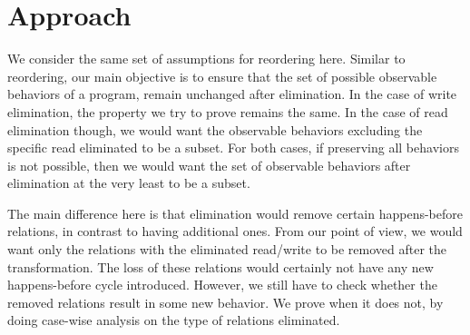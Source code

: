 \section{Approach}

    We consider the same set of assumptions for reordering here. 
    Similar to reordering, our main objective is to ensure that the set of possible observable behaviors of a program, remain unchanged after elimination. 
    In the case of write elimination, the property we try to prove remains the same.
    In the case of read elimination though, we would want the observable behaviors excluding the specific read eliminated to be a subset.
    For both cases, if preserving all behaviors is not possible, then we would want the set of observable behaviors after elimination at the very least to be a subset.

    The main difference here is that elimination would remove certain happens-before relations, in contrast to having additional ones.
    From our point of view, we would want only the relations with the eliminated read/write to be removed after the transformation.
    The loss of these relations would certainly not have any new happens-before cycle introduced. 
    However, we still have to check whether the removed relations result in some new behavior. 
    We prove when it does not, by doing case-wise analysis on the type of relations eliminated.  